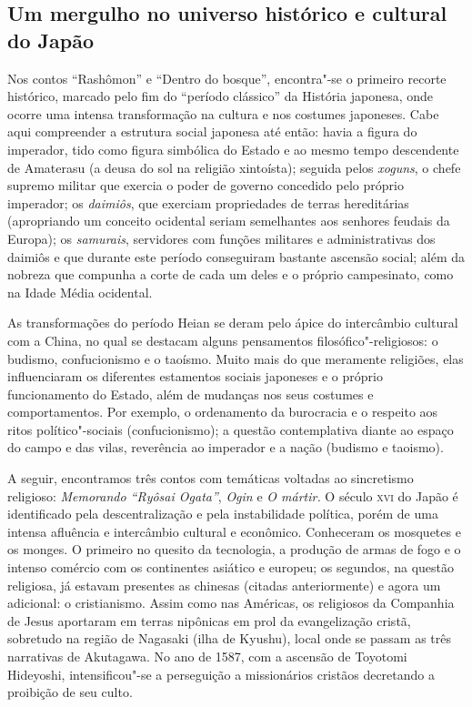 \documentclass[12pt]{extarticle}
\begin{document}

\subsection{Um mergulho no universo histórico e cultural do Japão}

Nos contos ``Rashômon'' e ``Dentro do bosque'', encontra"-se o primeiro
recorte histórico, marcado pelo fim do ``período clássico'' da História
japonesa, onde ocorre uma intensa transformação na cultura e nos costumes
japoneses. Cabe aqui compreender a estrutura social japonesa até então: havia a
figura do imperador, tido como figura simbólica do Estado e ao mesmo tempo
descendente de Amaterasu (a deusa do sol na religião xintoísta); seguida pelos
\emph{xoguns}, o chefe supremo militar que exercia o poder de governo concedido
pelo próprio imperador; os \emph{daimiôs}, que exerciam propriedades de terras
hereditárias (apropriando um conceito ocidental seriam semelhantes aos senhores
feudais da Europa); os \emph{samurais}, servidores com funções militares e
administrativas dos daimiôs e que durante este período conseguiram bastante
ascensão social; além da nobreza que compunha a corte de cada um deles e o
próprio campesinato, como na Idade Média ocidental.

As transformações do período Heian se deram pelo ápice do intercâmbio cultural
com a China, no qual se destacam alguns pensamentos filosófico"-religiosos: o
budismo, confucionismo e o taoísmo. Muito mais do que meramente religiões, elas
influenciaram os diferentes estamentos sociais japoneses e o próprio
funcionamento do Estado, além de mudanças nos seus costumes e comportamentos.
Por exemplo, o ordenamento da burocracia e o respeito aos ritos
político"-sociais (confucionismo); a questão contemplativa diante ao espaço do
campo e das vilas, reverência ao imperador e a nação (budismo e taoismo).

A seguir, encontramos três contos com temáticas voltadas ao sincretismo
religioso: \emph{Memorando ``Ryôsai Ogata''}, \emph{Ogin} e \emph{O mártir.} O
século \textsc{xvi} do Japão é identificado pela descentralização e pela
instabilidade política, porém de uma intensa afluência e intercâmbio cultural e
econômico. Conheceram os mosquetes e os monges. O primeiro no quesito da
tecnologia, a produção de armas de fogo e o intenso comércio com os continentes
asiático e europeu; os segundos, na questão religiosa, já estavam presentes as
chinesas (citadas anteriormente) e agora um adicional: o cristianismo. Assim
como nas Américas, os religiosos da Companhia de Jesus aportaram em terras
nipônicas em prol da evangelização cristã, sobretudo na região de Nagasaki
(ilha de Kyushu), local onde se passam as três narrativas de Akutagawa. No ano
de 1587, com a ascensão de Toyotomi Hideyoshi, intensificou"-se a perseguição a
missionários cristãos decretando a proibição de seu culto.
\end{document}
